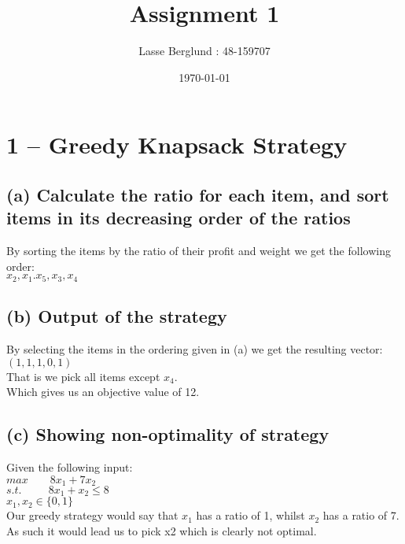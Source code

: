 \documentclass[12pt]{report}
\title{Assignment 1}
\author{Lasse Berglund : 48-159707}
\date{\today}
\begin{document}
\maketitle
\section*{1 -- Greedy Knapsack Strategy}
\subsection*{(a) Calculate the ratio for each item, and sort items in its decreasing order of the ratios}
By sorting the items by the ratio of their profit and weight we get the following order: \\

$x_2,x_1.x_5,x_3,x_4$

\subsection*{(b) Output of the strategy}
By selecting the items in the ordering given in (a) we get the resulting vector: \\
$(1,1,1,0,1)$ \\
That is we pick all items except $x_4$. \\
Which gives us an objective value of 12.

\subsection*{(c) Showing non-optimality of strategy}
Given the following input: \\
$max  \qquad 8x_1 + 7x_2$ \\
$s.t.\  \ \qquad 8x_1 + x_2 \le 8$ \\
$x_1,x_2 \in \{0,1\}$ \\

Our greedy strategy would say that $x_1$ has a ratio of 1, whilst $x_2$ has a ratio of 7. As such it would lead us to pick x2 which is clearly not optimal.


\newpage
\end{document}
